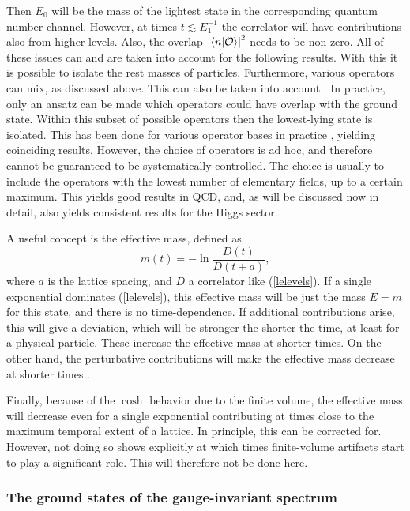 \documentclass[final,12pt,3p,longtitle]{elsarticle}
\newcommand*{\no}{\noindent}
\newcommand*{\be}{\begin{equation}}
\newcommand*{\ee}{\end{equation}}
\newcommand*{\pref}[1]{(\ref{#1})}
\newcommand*{\1}{1\!\!\!\bot}
\newcommand*{\la}{\left\langle}
\newcommand*{\ra}{\right\rangle}
\newcommand*{\op}{{\cal O}}
\begin{document}
Then $E_0$ will be the mass of the lightest state in the corresponding quantum number channel. However, at times $t\lesssim E_1^{-1}$ the correlator will have contributions also from higher levels. Also, the overlap $\left|\la n|\op\ra\right|^2$ needs to be non-zero. All of these issues can \cite{Gattringer:2010zz} and are taken into account \cite{Wurtz:2013ova,Maas:2013aia,Maas:2014pba} for the following results. With this it is possible to isolate the rest masses of particles. Furthermore, various operators can mix, as discussed above. This can also be taken into account \cite{Gattringer:2010zz}. In practice, only an ansatz can be made which operators could have overlap with the ground state. Within this subset of possible operators then the lowest-lying state is isolated. This has been done for various operator bases in practice \cite{Wurtz:2013ova,Maas:2013aia,Maas:2014pba}, yielding coinciding results. However, the choice of operators is ad hoc, and therefore cannot be guaranteed to be systematically controlled. The choice is usually to include the operators with the lowest number of elementary fields, up to a certain maximum. This yields good results in QCD, and, as will be discussed now in detail, also yields consistent results for the Higgs sector.

A useful concept is the effective mass, defined as \cite{Maas:2011se,Gattringer:2010zz,Montvay:1994cy}
\be
m(t)=-\ln\frac{D(t)}{D(t+a)}\label{effmass},
\ee
\no where $a$ is the lattice spacing, and $D$ a correlator like \pref{lelevels}. If a single exponential dominates \pref{lelevels}, this effective mass will be just the mass $E=m$ for this state, and there is no time-dependence. If additional contributions arise, this will give a deviation, which will be stronger the shorter the time, at least for a physical particle. These increase the effective mass at shorter times. On the other hand, the perturbative contributions will make the effective mass decrease at shorter times \cite{Maas:2011se}.

Finally, because of the $\cosh$ behavior due to the finite volume, the effective mass will decrease even for a single exponential contributing at times close to the maximum temporal extent of a lattice. In principle, this can be corrected for. However, not doing so shows explicitly at which times finite-volume artifacts start to play a significant role. This will therefore not be done here. 

\subsubsection{The ground states of the gauge-invariant spectrum}\label{sss:ground}
\end{document}
